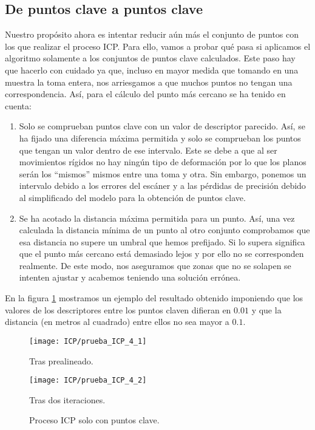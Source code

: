 \subsection{De puntos clave a puntos clave}
Nuestro propósito ahora es intentar reducir aún más el conjunto de puntos con los que realizar el proceso ICP. Para ello, vamos a probar qué pasa si aplicamos el algoritmo solamente a los conjuntos de puntos clave calculados. Este paso hay que hacerlo con cuidado ya que, incluso en mayor medida que tomando en una muestra la toma entera, nos arriesgamos a que muchos puntos no tengan una correspondencia. Así, para el cálculo del punto más cercano se ha tenido en cuenta: 

\begin{enumerate}
\item Solo se comprueban puntos clave con un valor de descriptor parecido. Así, se ha fijado una diferencia máxima permitida y solo se comprueban los puntos que tengan un valor dentro de ese intervalo. Este se debe a que al ser movimientos rígidos no hay ningún tipo de deformación por lo que los planos serán los ``mismos'' mismos entre una toma y otra. Sin embargo, ponemos un intervalo debido a los errores del escáner y a las pérdidas de precisión debido al simplificado del modelo para la obtención de puntos clave.
\item Se ha acotado la distancia máxima permitida para un punto. Así, una vez calculada la distancia mínima de un punto al otro conjunto comprobamos que esa distancia no supere un umbral que hemos prefijado. Si lo supera significa que el punto más cercano está demasiado lejos y por ello no se corresponden realmente. De este modo, nos aseguramos que zonas que no se solapen se intenten ajustar y acabemos teniendo una solución errónea. 
\end{enumerate}

En la figura \ref{fig:KPKPICP} mostramos un ejemplo del resultado obtenido imponiendo que los valores de los descriptores entre los puntos claven difieran en $ 0.01 $ y que la distancia (en metros al cuadrado) entre ellos no sea mayor a $ 0.1 $. \\

\begin{figure}[h!]
	
	\begin{minipage}[b]{0.5\textwidth}
		\centering
		\texttt{[image: ICP/prueba\_ICP\_4\_1]} 
		\caption*{Tras prealineado.}
	\end{minipage}
	\begin{minipage}[b]{0.5\textwidth}
		\centering
		\texttt{[image: ICP/prueba\_ICP\_4\_2]}
		\caption*{Tras dos iteraciones.}
	\end{minipage}
	\caption{Proceso ICP solo con puntos clave.}
	\label{fig:KPKPICP}
\end{figure}

